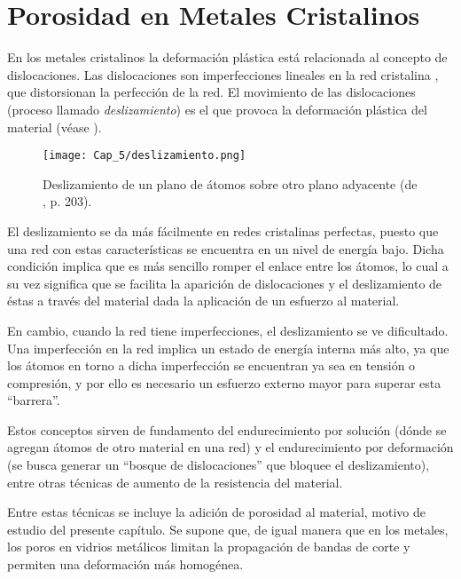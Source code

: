 
\section{Porosidad en Metales Cristalinos}
\label{S5_2}

En los metales cristalinos la deformación plástica está relacionada al concepto de dislocaciones. Las dislocaciones son imperfecciones lineales en
la red cristalina \citep{askeland98}, que distorsionan la perfección de la red. El movimiento de las dislocaciones (proceso llamado
\textit{deslizamiento}) es el que provoca la deformación plástica del material (véase ).

\begin{figure}[h!]
\centering
  \texttt{[image: Cap\_5/deslizamiento.png]}
  \caption[Deslizamiento de un plano de átomos sobre otro plano adyacente]{Deslizamiento de un plano de átomos sobre otro plano adyacente
  (de \cite{shackelford04}, p. 203).}
  \label{C5:fg:dislocaciones}
\end{figure}

El deslizamiento se da más fácilmente en redes cristalinas perfectas, puesto que una red con estas características se encuentra en un nivel
de energía bajo. Dicha condición implica que es más sencillo romper el enlace entre los átomos, lo cual a su vez significa que se facilita
la aparición de dislocaciones y el deslizamiento de éstas a través del material dada la aplicación de un esfuerzo al material.

En cambio, cuando la red tiene imperfecciones, el deslizamiento se ve dificultado. Una imperfección en la red implica un estado de energía
interna más alto, ya que los átomos en torno a dicha imperfección se encuentran ya sea en tensión o compresión, y por ello es necesario un
esfuerzo externo mayor para superar esta ``barrera''.

Estos conceptos sirven de fundamento del endurecimiento por solución (dónde se agregan átomos de otro material en una red) y el endurecimiento por deformación (se busca generar un ``bosque de dislocaciones'' que bloquee el deslizamiento), entre otras técnicas de aumento de la resistencia del material. 

Entre estas técnicas se incluye la adición de porosidad al material, motivo de estudio del presente capítulo. Se supone que, de igual manera que en los metales, los poros en vidrios metálicos limitan la propagación de bandas de corte y permiten una deformación más homogénea.

